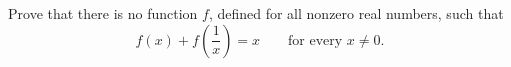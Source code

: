 Prove that there is no function $f$, defined for all nonzero real numbers, such that
\[
f(x)+f\!\left(\dfrac{1}{x}\right)=x\qquad\text{for every }x\ne0 .
\]
